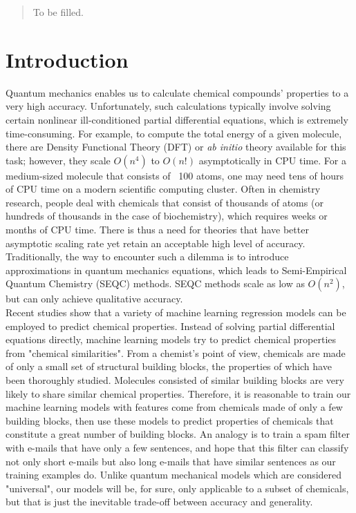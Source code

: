 \begin{abstract}
To be filled.    
\end{abstract}
\section{Introduction}
\noindent Quantum mechanics enables us to calculate chemical compounds' properties to a very high accuracy. Unfortunately, such calculations typically involve solving certain nonlinear ill-conditioned partial differential equations, which is extremely time-consuming. For example, to compute the total energy of a given molecule, there are Density Functional Theory (DFT) or \textit{ab initio} theory available for this task; however, they scale $O(n^4)$ to $O(n!)$ asymptotically in CPU time. For a medium-sized molecule that consists of ~100 atoms, one may need tens of hours of CPU time on a modern scientific computing cluster. Often in chemistry research, people deal with chemicals that consist of thousands of atoms (or hundreds of thousands in the case of biochemistry), which requires weeks or months of CPU time. There is thus a need for theories that have better asymptotic scaling rate yet retain an acceptable high level of accuracy. Traditionally, the way to encounter such a dilemma is to introduce approximations in quantum mechanics equations, which leads to Semi-Empirical Quantum Chemistry (SEQC) methods. SEQC methods scale as low as $O(n^2)$, but can only achieve qualitative accuracy. \\

Recent studies show that a variety of machine learning regression models can be employed to predict chemical properties. Instead of solving partial differential equations directly, machine learning models try to predict chemical properties from "chemical similarities". From a chemist's point of view, chemicals are made of only a small set of structural building blocks, the properties of which have been thoroughly studied. Molecules consisted of similar building blocks are very likely to share similar chemical properties. Therefore, it is reasonable to train our machine learning models with features come from chemicals made of only a few building blocks, then use these models to predict properties of chemicals that constitute a great number of building blocks. An analogy is to train a spam filter with e-mails that have only a few sentences, and hope that this filter can classify not only short e-mails but also long e-mails that have similar sentences as our training examples do. Unlike quantum mechanical models which are considered "universal", our models will be, for sure, only applicable to a subset of chemicals, but that is just the inevitable trade-off between accuracy and generality. \\

